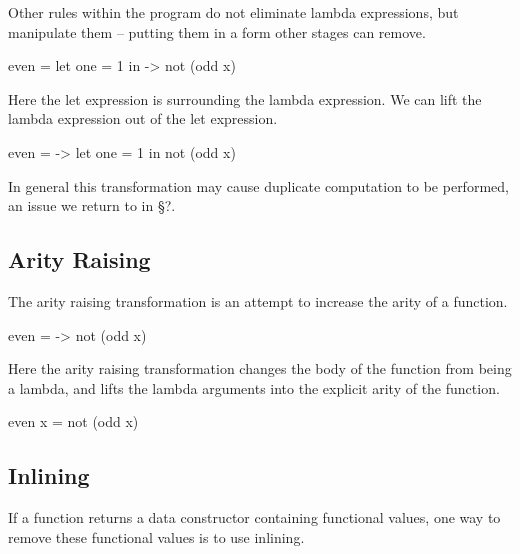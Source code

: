 \documentclass[preprint]{sigplanconf}
\begin{document}
Other rules within the program do not eliminate lambda expressions, but manipulate them -- putting them in a form other stages can remove.

\begin{example}
\begin{code}
even = let one = 1 in \x -> not (odd x)
\end{code}

Here the let expression is surrounding the lambda expression. We can lift the lambda expression out of the let expression.

\begin{code}
even = \x -> let one = 1 in not (odd x)
\end{code}

In general this transformation may cause duplicate computation to be performed, an issue we return to in \S?.
\end{example}


\subsection{Arity Raising}

The arity raising transformation is an attempt to increase the arity of a function.

\begin{example}
\begin{code}
even = \x -> not (odd x)
\end{code}

Here the arity raising transformation changes the body of the function from being a lambda, and lifts the lambda arguments into the explicit arity of the function.

\begin{code}
even x = not (odd x)
\end{code}
\end{example}


\subsection{Inlining}

If a function returns a data constructor containing functional values, one way to remove these functional values is to use inlining.
\end{document}
